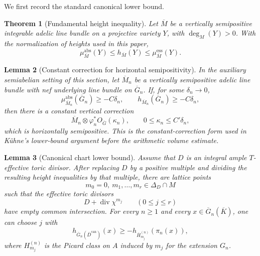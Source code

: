 \documentclass[10pt,a4paper]{amsart}
\theoremstyle{plain}
\newtheorem{theorem}{Theorem}
\newtheorem{lemma}[theorem]{Lemma}
\theoremstyle{plain}
\numberwithin{equation}{section}
\providecommand{\can}{\operatorname{can}}
\providecommand{\muess}{\mu^{\mathrm{ess}}}
\providecommand{\muabs}{\mu^{\mathrm{abs}}}
\begin{document}
We first record the standard canonical lower bound.

\begin{theorem}[Fundamental height inequality]
	\label{input:fundamental-height-inequality}
	Let \(\overline M\) be a vertically semipositive integrable adelic line bundle
	on a projective variety \(Y\), with \(\deg_M(Y)>0\).  With the normalization of
	heights used in this paper,
	\[
	\muabs_{\overline M}(Y)\le h_{\overline M}(Y)\le \muess_{\overline M}(Y).
	\]
\end{theorem}

\begin{lemma}[Constant correction for horizontal semipositivity]
	\label{input:constant-correction-horizontal}
	In the auxiliary semiabelian setting of this section, let
	\(\overline M_n\) be a vertically semipositive adelic line bundle with nef
	underlying line bundle on \(\overline G_n\).  If, for some \(\delta_n\to0\),
	\[
	\muabs_{\overline M_n}(\overline G_n)\ge -C\delta_n,
	\qquad
	h_{\overline M_n}(\overline G_n)\ge -C\delta_n,
	\]
	then there is a constant vertical correction
	\[
	\overline M_n\otimes \varphi_n^*O_{\overline G}(\kappa_n),
	\qquad 0\le \kappa_n\le C'\delta_n,
	\]
	which is horizontally semipositive.  This is the constant-correction form used
	in K\"uhne's lower-bound argument before the arithmetic volume estimate.
\end{lemma}

\begin{lemma}[Canonical chart lower bound]
	\label{lem:canonical-chart-lower}
	Assume that \(D\) is an integral ample \(T\)-effective toric divisor.  After
	replacing \(D\) by a positive multiple and dividing the resulting height
	inequalities by that multiple, there are lattice points
	\[
	m_0=0,\ m_1,\ldots,m_r\in\Delta_D\cap M
	\]
	such that the effective toric divisors
	\[
	D+\operatorname{div}\chi^{m_j}\qquad (0\le j\le r)
	\]
	have empty common intersection.  For every \(n\ge1\) and every
	\(x\in\overline G_n(\overline K)\), one can choose \(j\) with
	\[
	h_{\overline G_n(\overline D^{\can})}(x)
	\ge
	-h_{\overline H^{(n)}_{m_j}}(\pi_n(x)),
	\]
	where \(H^{(n)}_{m_j}\) is the Picard class on \(A\) induced by \(m_j\) for the
	extension \(G_n\).
\end{lemma}
\end{document}
